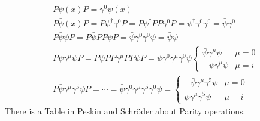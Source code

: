 \documentclass[]{scrartcl}
\begin{document}
\begin{gather}
	P\psi(x)P = \gamma^0 \psi(x)\\
	P\bar\psi(x) P = P\psi^\dagger\gamma^0P = P\psi^\dagger P P\gamma^0 P = \psi^\dagger\gamma^0\gamma^0 = \bar\psi\gamma^0\\
	P\bar\psi\psi P = P\bar\psi PP \psi P = \bar\psi\gamma^0\gamma^0\psi = \bar\psi\psi\\
	P\bar\psi \gamma^\mu \psi P = P\bar\psi PP \gamma^\mu PP \psi P = \bar\psi \gamma^0 \gamma^\mu \gamma^0 \psi
	\begin{cases}
		\bar\psi\gamma^\mu\psi& \mu = 0\\
		-\psi\gamma^\mu\psi &\mu = i
	\end{cases}\\
	P\bar\psi \gamma^\mu\gamma^5\psi P = \cdots = \bar\psi\gamma^0\gamma^\mu\gamma^5\gamma^0\psi=
	\begin{cases}
		-\bar\psi\gamma^\mu\gamma^5\psi & \mu = 0\\
		\bar\psi\gamma^\mu\gamma^5\psi & \mu = i
	\end{cases}
\end{gather}
There is a Table in Peskin and Schröder about Parity operations.
\end{document}
